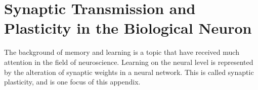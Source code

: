 
\chapter{Synaptic Transmission and Plasticity in the Biological Neuron} %
\label{appendixSynapticPlasticity}




The background of memory and learning is a topic that have received much attention in the field of neuroscience. 
Learning on the neural level is represented by the alteration of synaptic weights in a neural network. 
This is called synaptic plasticity, and is one focus of this appendix.


 

